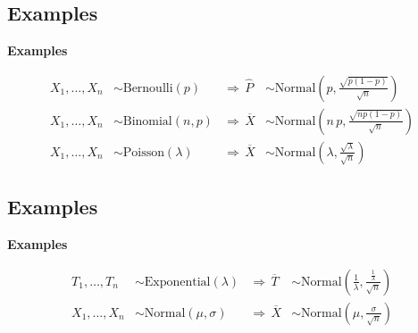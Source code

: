 \documentclass[compress]{beamer}        %
\makeatletter
\newcommand{\tcb}{\textcolor{beamer@blendedblue}}
\makeatother
\begin{document}
\subsection{Examples}
\begin{frame}{\bf \tcb{Examples}}

\begin{align*}
X_1,\ldots,X_n &\sim \text{Bernoulli}(p) & \Rightarrow \,\widehat{\!P} &\sim \text{Normal}\left(p, \frac{\sqrt{p(1-p)}}{\sqrt{n}}\right)\\[1cm]
X_1,\ldots,X_n &\sim \text{Binomial}(n,p) & \Rightarrow \,\overline{\!X} &\sim \text{Normal}\left(n\,p, \frac{\sqrt{np(1-p)}}{\sqrt{n}}\right)\\[1cm]
X_1,\ldots,X_n &\sim \text{Poisson}(\lambda) & \Rightarrow \,\overline{\!X} &\sim \text{Normal}\left(\lambda, \frac{\sqrt{\lambda}}{\sqrt{n}}\right)
\end{align*}


\end{frame}


\subsection{Examples}
\begin{frame}{\bf \tcb{Examples}}

\begin{align*}
T_1,\ldots,T_n &\sim \text{Exponential}(\lambda) & \Rightarrow \,\overline{\!T} &\sim \text{Normal}\left(\frac{1}{\lambda}, \frac{\tfrac{1}{\lambda}}{\sqrt{n}}\right)\\[1cm]
X_1,\ldots,X_n &\sim \text{Normal}(\mu,\sigma) & \Rightarrow \,\overline{\!X} &\sim \text{Normal}\left(\mu, \frac{\sigma}{\sqrt{n}}\right)
\end{align*}


\end{frame}
\end{document}
